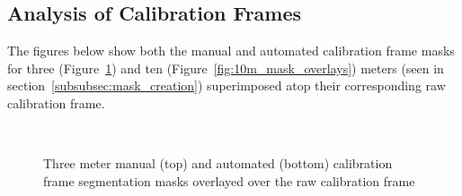 \subsection{Analysis of Calibration Frames}

The figures below show both the manual and automated calibration frame masks for
three (Figure~\ref{fig:3m_mask_overlays}) and ten (Figure~\ref{fig:10m_mask_overlays})
meters (seen in section~\ref{subsubsec:mask_creation}) superimposed atop their
corresponding raw calibration frame.

\vspace{1cm}

\begin{figure}[htbp]
    \centering
    \\[1mm]
    \caption{Three meter manual (top) and automated (bottom) calibration frame segmentation masks overlayed over
    the raw calibration frame}
    \label{fig:3m_mask_overlays}
\end{figure}

